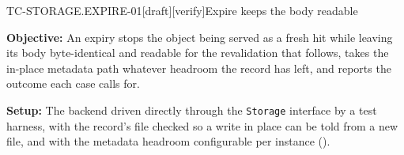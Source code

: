 \begin{requirement}{TC-STORAGE.EXPIRE-01}[draft][verify]{Expire keeps the body readable}


  \textbf{Objective:} An expiry stops the object being served as a fresh hit
  while leaving its body byte-identical and readable for the revalidation that
  follows, takes the in-place metadata path whatever headroom the record has
  left, and reports the outcome each case calls for.

  \textbf{Setup:} The backend driven directly through the \texttt{Storage}
  interface by a test harness, with the record's file checked so a write in
  place can be told from a new file, and with the metadata headroom
  configurable per instance ().


\end{requirement}
